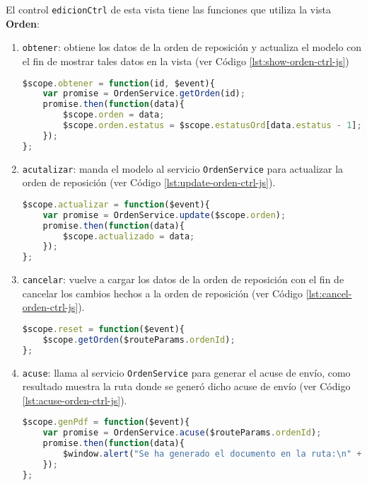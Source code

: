 El control \texttt{edicionCtrl} de esta vista tiene las funciones que utiliza la vista \textbf{Orden}:
\begin{enumerate}
	\item \texttt{obtener}: obtiene los datos de la orden de reposición y actualiza el modelo con el fin de mostrar tales datos en la vista (ver Código \ref{lst:show-orden-ctrl-js})
\begin{lstlisting}[language=Javascript, caption={Función del controlador para llenar los datos de la vista de orden de reposición.}, captionpos=b, label={lst:show-orden-ctrl-js}]
$scope.obtener = function(id, $event){
	var promise = OrdenService.getOrden(id);
	promise.then(function(data){
		$scope.orden = data;
		$scope.orden.estatus = $scope.estatusOrd[data.estatus - 1];
	});
};
\end{lstlisting}

	\item \texttt{acutalizar}: manda el modelo al servicio \texttt{OrdenService} para actualizar la orden de reposición (ver Código \ref{lst:update-orden-ctrl-js}).
\begin{lstlisting}[language=Javascript, caption={Función del controlador de \textit{AngularJS} para actualizar una orden de reposición.}, captionpos=b, label={lst:update-orden-ctrl-js}]
$scope.actualizar = function($event){
	var promise = OrdenService.update($scope.orden);
	promise.then(function(data){
		$scope.actualizado = data;
	});
};
\end{lstlisting}

	\item \texttt{cancelar}: vuelve a cargar los datos de la orden de reposición con el fin de cancelar los cambios hechos a la orden de reposición (ver Código \ref{lst:cancel-orden-ctrl-js}).
\begin{lstlisting}[language=Javascript, caption={Función del controlador de \textit{AngularJS} para cancelar los cambios en una orden de reposición}, captionpos=b, label={lst:cancel-orden-ctrl-js}]
$scope.reset = function($event){
	$scope.getOrden($routeParams.ordenId);
};
\end{lstlisting}

	\item \texttt{acuse}: llama al servicio \texttt{OrdenService} para generar el acuse de envío, como resultado muestra la ruta donde se generó dicho acuse de envío (ver Código \ref{lst:acuse-orden-ctrl-js}).
\begin{lstlisting}[language=Javascript, caption={Función del controlador de \textit{AngularJS} para generar el acuse de envío de la orden de reposición.}, captionpos=b, label={lst:acuse-orden-ctrl-js}]
$scope.genPdf = function($event){
	var promise = OrdenService.acuse($routeParams.ordenId);
	promise.then(function(data){
		$window.alert("Se ha generado el documento en la ruta:\n" + data);
	});
};
\end{lstlisting}

\end{enumerate}

